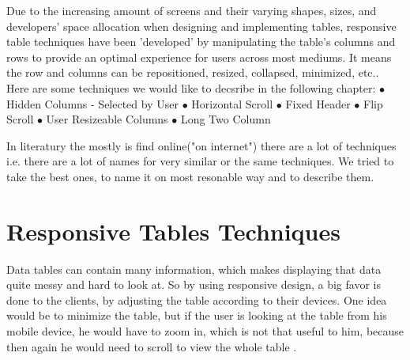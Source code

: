 Due to the increasing amount of screens and their varying shapes, sizes, 
and developers' space allocation when designing and implementing tables, 
responsive table techniques have been 'developed' by manipulating the table's 
columns and rows to provide an optimal experience for users across most mediums. It means the row and 
columns can be repositioned, 
resized, collapsed, minimized, etc..
Here are some techniques we would like to decsribe in the following chapter:
\newline
\newline $\bullet$ Hidden Columns - Selected by User
\newline $\bullet$ Horizontal Scroll
\newline $\bullet$ Fixed Header
\newline $\bullet$ Flip Scroll
\newline $\bullet$ User Resizeable Columns
\newline $\bullet$ Long Two Column

In literatury the mostly is find online("on internet") there are a lot of techniques i.e. 
there are a lot of names for very similar or the same techniques. We tried to take the best ones, 
to name it on most resonable way and to describe them. 

\newpage
\section{Responsive Tables Techniques}



Data tables can contain many information, which makes displaying that data quite messy and hard to
look at. So by using responsive design, a big favor is done to the clients,
by adjusting the table according to their devices. One idea would be to minimize the table, but if the user is looking
at the table from his mobile device, he would have to zoom in, which is not that useful to him, because then again he would need to scroll
to view the whole table \parencite{9}.

